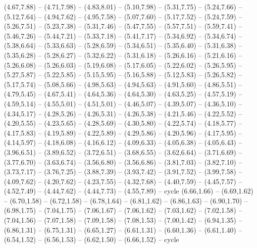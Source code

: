 \expandafter\def\csname geo:gebiet:GRL\endcsname{
  (4.67,7.88) -- (4.71,7.98) -- (4.83,8.01) -- (5.10,7.98) -- (5.31,7.75) -- (5.24,7.66) -- (5.12,7.64) -- (4.94,7.62) -- (4.95,7.58) -- (5.07,7.60) -- (5.17,7.52) -- (5.24,7.59) -- (5.26,7.51) -- (5.23,7.38) -- (5.31,7.46) -- (5.47,7.55) -- (5.57,7.51) -- (5.59,7.41) -- (5.46,7.26) -- (5.44,7.21) -- (5.33,7.18) -- (5.41,7.17) -- (5.34,6.92) -- (5.34,6.74) -- (5.38,6.64) -- (5.33,6.63) -- (5.28,6.59) -- (5.34,6.51) -- (5.35,6.40) -- (5.31,6.38) -- (5.35,6.28) -- (5.28,6.27) -- (5.32,6.22) -- (5.31,6.18) -- (5.26,6.16) -- (5.21,6.16) -- (5.26,6.08) -- (5.26,6.03) -- (5.19,6.08) -- (5.17,6.05) -- (5.22,6.02) -- (5.26,5.95) -- (5.27,5.87) -- (5.22,5.85) -- (5.15,5.95) -- (5.16,5.88) -- (5.12,5.83) -- (5.26,5.82) -- (5.17,5.74) -- (5.08,5.66) -- (4.98,5.63) -- (4.94,5.63) -- (4.91,5.60) -- (4.86,5.51) -- (4.79,5.45) -- (4.67,5.41) -- (4.64,5.36) -- (4.64,5.30) -- (4.63,5.25) -- (4.57,5.19) -- (4.59,5.14) -- (4.55,5.01) -- (4.51,5.01) -- (4.46,5.07) -- (4.39,5.07) -- (4.36,5.10) -- (4.34,5.17) -- (4.28,5.26) -- (4.26,5.31) -- (4.26,5.38) -- (4.21,5.46) -- (4.22,5.52) -- (4.20,5.55) -- (4.23,5.65) -- (4.28,5.69) -- (4.30,5.80) -- (4.22,5.74) -- (4.18,5.77) -- (4.17,5.83) -- (4.19,5.89) -- (4.22,5.89) -- (4.29,5.86) -- (4.20,5.96) -- (4.17,5.95) -- (4.14,5.97) -- (4.18,6.08) -- (4.16,6.12) -- (4.09,6.33) -- (4.05,6.38) -- (4.05,6.43) -- (3.96,6.51) -- (3.89,6.52) -- (3.72,6.51) -- (3.68,6.55) -- (3.62,6.64) -- (3.71,6.69) -- (3.77,6.70) -- (3.63,6.74) -- (3.56,6.80) -- (3.56,6.86) -- (3.81,7.03) -- (3.82,7.10) -- (3.73,7.17) -- (3.76,7.25) -- (3.88,7.39) -- (3.93,7.42) -- (3.91,7.52) -- (3.99,7.58) -- (4.09,7.62) -- (4.20,7.62) -- (4.23,7.55) -- (4.32,7.68) -- (4.40,7.59) -- (4.45,7.57) -- (4.52,7.49) -- (4.44,7.62) -- (4.44,7.73) -- (4.55,7.89) -- cycle}
\expandafter\def\csname geo:gebiet:ATF\endcsname{
  }
\expandafter\def\csname geo:gebiet:TLS\endcsname{
  }
\expandafter\def\csname geo:gebiet:ZAF\endcsname{
  (6.66,1.66) -- (6.69,1.62) -- (6.70,1.58) -- (6.72,1.58) -- (6.78,1.64) -- (6.81,1.62) -- (6.86,1.63) -- (6.90,1.70) -- (6.98,1.75) -- (7.04,1.75) -- (7.06,1.67) -- (7.06,1.62) -- (7.03,1.62) -- (7.02,1.58) -- (7.04,1.56) -- (7.07,1.58) -- (7.09,1.58) -- (7.08,1.53) -- (7.00,1.42) -- (6.94,1.35) -- (6.86,1.31) -- (6.75,1.31) -- (6.65,1.27) -- (6.61,1.31) -- (6.60,1.36) -- (6.61,1.40) -- (6.54,1.52) -- (6.56,1.53) -- (6.62,1.50) -- (6.66,1.52) -- cycle}
\expandafter\def\csname geo:gebiet:LSO\endcsname{
  }
